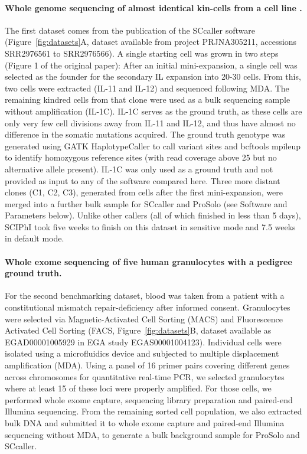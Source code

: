 \documentclass[12pt,inline]{wlscirep}
\begin{document}
\paragraph{Whole genome sequencing of almost identical kin-cells from a cell line \cite{dong_accurate_2017}.}
The first dataset comes from the publication of the SCcaller software\cite{dong_accurate_2017} (Figure~\ref{fig:datasets}A, dataset available from project \mbox{PRJNA305211}, accessions \mbox{SRR2976561} to \mbox{SRR2976566}).
A single starting cell was grown in two steps (Figure 1 of the original paper\cite{dong_accurate_2017}):
After an initial mini-expansion, a single cell was selected as the founder for the secondary IL expansion into 20-30 cells.
From this, two cells were extracted (IL-11 and IL-12) and sequenced following MDA.
The remaining kindred cells from that clone were used as a bulk sequencing sample without amplification (IL-1C).
IL-1C serves as the ground truth, as these cells are only very few cell divisions away from IL-11 and IL-12, and thus have almost no difference in the somatic mutations acquired.
The ground truth genotype was generated using GATK HaplotypeCaller to call variant sites and bcftools mpileup to identify homozygous reference sites (with read coverage above 25 but no alternative allele present).
IL-1C was only used as a ground truth and not provided as input to any of the software compared here.
Three more distant clones (C1, C2, C3), generated from cells after the first mini-expansion, were merged into a further bulk sample for SCcaller and ProSolo (see Software and Parameters below).
Unlike other callers (all of which finished in less than 5 days), SCIPhI took five weeks to finish on this dataset in sensitive mode and 7.5 weeks in default mode.\\

\paragraph{Whole exome sequencing of five human granulocytes with a pedigree ground truth.}
For the second benchmarking dataset, blood was taken from a patient with a constitutional mismatch repair-deficiency\cite{hoell_constitutional_2014} after informed consent.
Granulocytes were selected via Magnetic-Activated Cell Sorting (MACS) and Fluorescence Activated Cell Sorting (FACS, Figure~\ref{fig:datasets}B, dataset available as \mbox{EGAD00001005929} in EGA study \mbox{EGAS00001004123}).
Individual cells were isolated using a microfluidics device and subjected to multiple displacement amplification (MDA).
Using a panel of 16 primer pairs covering different genes across chromosomes for quantitative real-time PCR, we selected granulocytes where at least 15 of these loci were properly amplified.
For those cells, we performed whole exome capture, sequencing library preparation and paired-end Illumina sequencing.
From the remaining sorted cell population, we also extracted bulk DNA and submitted it to whole exome capture and paired-end Illumina sequencing without MDA, to generate a bulk background sample for ProSolo and SCcaller.
\end{document}
